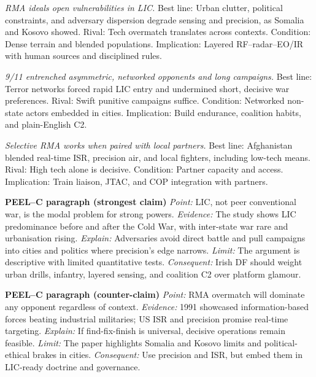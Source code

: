 \textit{RMA ideals open vulnerabilities in LIC.} Best line: Urban clutter, political constraints, and adversary dispersion degrade sensing and precision, as Somalia and Kosovo showed. Rival: Tech overmatch translates across contexts. Condition: Dense terrain and blended populations. Implication: Layered RF–radar–EO/IR with human sources and disciplined rules.

\textit{9/11 entrenched asymmetric, networked opponents and long campaigns.} Best line: Terror networks forced rapid LIC entry and undermined short, decisive war preferences. Rival: Swift punitive campaigns suffice. Condition: Networked non-state actors embedded in cities. Implication: Build endurance, coalition habits, and plain-English C2.

\textit{Selective RMA works when paired with local partners.} Best line: Afghanistan blended real-time ISR, precision air, and local fighters, including low-tech means. Rival: High tech alone is decisive. Condition: Partner capacity and access. Implication: Train liaison, JTAC, and COP integration with partners.

\textbf{PEEL–C paragraph (strongest claim)}
\textit{Point:} LIC, not peer conventional war, is the modal problem for strong powers.
\textit{Evidence:} The study shows LIC predominance before and after the Cold War, with inter-state war rare and urbanisation rising.
\textit{Explain:} Adversaries avoid direct battle and pull campaigns into cities and politics where precision’s edge narrows.
\textit{Limit:} The argument is descriptive with limited quantitative tests.
\textit{Consequent:} Irish DF should weight urban drills, infantry, layered sensing, and coalition C2 over platform glamour.

\textbf{PEEL–C paragraph (counter-claim)}
\textit{Point:} RMA overmatch will dominate any opponent regardless of context.
\textit{Evidence:} 1991 showcased information-based forces beating industrial militaries; US ISR and precision promise real-time targeting.
\textit{Explain:} If find-fix-finish is universal, decisive operations remain feasible.
\textit{Limit:} The paper highlights Somalia and Kosovo limits and political-ethical brakes in cities.
\textit{Consequent:} Use precision and ISR, but embed them in LIC-ready doctrine and governance.

